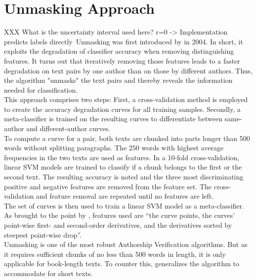 \section{Unmasking Approach}\label{sec:unmasking-approach}
XXX What is the uncertainty interval used here? r=0 -> Implementation predicts labels directly\
Unmasking was first introduced by \citeauthor{koppel2004unmasking} in 2004.
In short, it exploits the degradation of classifier accuracy when removing distinguishing features.
It turns out that iteratively removing those features leads to a faster degradation on text pairs by one author than on those by different authors.
Thus, the algorithm "unmasks" the text pairs and thereby reveals the information needed for classification.\\
This approach comprises two steps: First, a cross-validation method is employed to create the accuracy degradation curves for all training samples.
Secondly, a meta-classifier is trained on the resulting curves to differentiate between same-author and different-author curves.\\
To compute a curve for a pair, both texts are chunked into parts longer than 500 words without splitting paragraphs.
The 250 words with highest average frequencies in the two texts are used as features.
In a 10-fold cross-validation, linear SVM models are trained to classify if a chunk belongs to the first or the second text.
The resulting accuracy is noted and the three most discriminating positive and negative features are removed from the feature set.
The cross-validation and feature removal are repeated until no features are left.\\
The set of curves is then used to train a linear SVM model as a meta-classifier.
As brought to the point by \cite{bevendorff2019unmaskingShortTexts}, features used are ``the curve points, the curves' point-wise first- and second-order derivatives, and the derivatives sorted by steepest point-wise drop''.\\
Unmasking is one of the most robust Authorship Verification algorithms.
But as it requires sufficient chunks of no less than 500 words in length, it is only applicable for book-length texts.
To counter this, \cite{bevendorff2019unmaskingShortTexts} generalizes the algorithm to accommodate for short texts.
